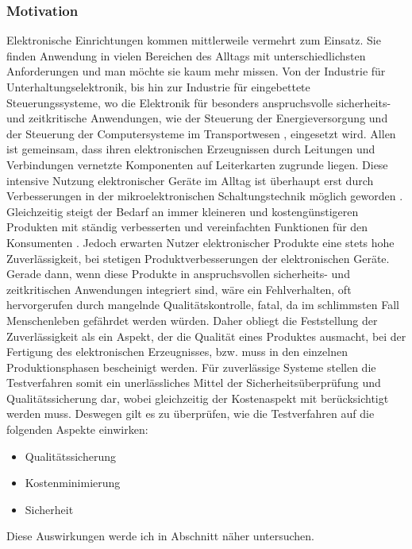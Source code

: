 \subsubsection{Motivation}
    Elektronische Einrichtungen kommen mittlerweile vermehrt zum Einsatz.
    Sie finden Anwendung in vielen Bereichen des Alltags mit unterschiedlichsten Anforderungen und man möchte sie kaum mehr missen.
    Von der Industrie für Unterhaltungselektronik, bis hin zur Industrie für eingebettete Steuerungssysteme, wo die Elektronik für besonders anspruchsvolle sicherheits- und zeitkritische Anwendungen, wie der Steuerung der Energieversorgung und der Steuerung der Computersysteme im Transportwesen \cite{eggersglus_test_2014}, eingesetzt wird.
    Allen ist gemeinsam, dass ihren elektronischen Erzeugnissen durch Leitungen und Verbindungen vernetzte Komponenten auf Leiterkarten zugrunde liegen.
    Diese intensive Nutzung elektronischer Geräte im Alltag ist überhaupt erst durch Verbesserungen in der mikroelektronischen Schaltungstechnik möglich geworden \cite{grout_integrated_2006}.
    Gleichzeitig steigt der Bedarf an immer kleineren und kostengünstigeren Produkten mit ständig verbesserten und vereinfachten Funktionen für den Konsumenten \cite{berger_test-_2012}.
    Jedoch erwarten Nutzer elektronischer Produkte eine stets hohe Zuverlässigkeit, bei stetigen Produktverbesserungen der elektronischen Geräte.
    Gerade dann, wenn diese Produkte in anspruchsvollen sicherheits- und zeitkritischen Anwendungen integriert sind, wäre ein Fehlverhalten, oft hervorgerufen durch mangelnde Qualitätskontrolle, fatal, da im schlimmsten Fall Menschenleben gefährdet werden würden.
    Daher obliegt die Feststellung der Zuverlässigkeit als ein Aspekt, der die Qualität eines Produktes ausmacht, bei der Fertigung des elektronischen Erzeugnisses, bzw. muss in den einzelnen Produktionsphasen bescheinigt werden.
    Für zuverlässige Systeme stellen die Testverfahren somit ein unerlässliches Mittel der Sicherheitsüberprüfung und Qualitätssicherung dar, wobei gleichzeitig der Kostenaspekt mit berücksichtigt werden muss.
    Deswegen gilt es zu überprüfen, wie die Testverfahren auf die folgenden Aspekte einwirken:

    \begin{itemize}
        \item Qualitätssicherung
        \item Kostenminimierung
        \item Sicherheit
    \end{itemize}

    Diese Auswirkungen werde ich in Abschnitt  näher untersuchen.